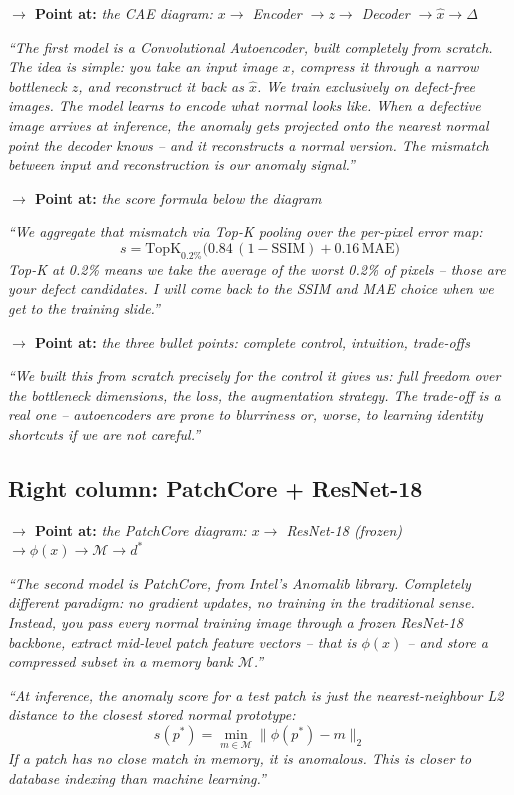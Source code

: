 \documentclass[12pt, a4paper]{article}
\newcommand{\say}[1]{%
  \begin{mdframed}[style=saybox]
  \itshape ``#1''
  \end{mdframed}
}
\newcommand{\pointer}[1]{\noindent\textbf{\color{teal}$\rightarrow$ Point at:} \textit{#1}\\[2pt]}
\begin{document}
\pointer{the CAE diagram: $x \to$ Encoder $\to z \to$ Decoder $\to \hat{x} \to \Delta$}

\say{The first model is a Convolutional Autoencoder, built completely from scratch. The idea is simple: you take an input image $x$, compress it through a narrow bottleneck $z$, and reconstruct it back as $\hat{x}$. We train exclusively on defect-free images. The model learns to encode what normal looks like. When a defective image arrives at inference, the anomaly gets projected onto the nearest normal point the decoder knows -- and it reconstructs a normal version. The mismatch between input and reconstruction is our anomaly signal.}

\pointer{the score formula below the diagram}

\say{We aggregate that mismatch via Top-K pooling over the per-pixel error map:
\[
  s = \mathrm{TopK}_{0.2\%}\!\bigl(0.84\,(1-\mathrm{SSIM}) + 0.16\,\mathrm{MAE}\bigr)
\]
Top-K at 0.2\% means we take the average of the worst 0.2\% of pixels -- those are your defect candidates. I will come back to the SSIM and MAE choice when we get to the training slide.}

\pointer{the three bullet points: complete control, intuition, trade-offs}

\say{We built this from scratch precisely for the control it gives us: full freedom over the bottleneck dimensions, the loss, the augmentation strategy. The trade-off is a real one -- autoencoders are prone to blurriness or, worse, to learning identity shortcuts if we are not careful.}

\subsection{Right column: PatchCore + ResNet-18}

\pointer{the PatchCore diagram: $x \to$ ResNet-18 (frozen) $\to \phi(x) \to \mathcal{M} \to d^*$}

\say{The second model is PatchCore, from Intel's Anomalib library. Completely different paradigm: no gradient updates, no training in the traditional sense. Instead, you pass every normal training image through a frozen ResNet-18 backbone, extract mid-level patch feature vectors -- that is $\phi(x)$ -- and store a compressed subset in a memory bank $\mathcal{M}$.}

\say{At inference, the anomaly score for a test patch is just the nearest-neighbour L2 distance to the closest stored normal prototype:
\[
  s(p^*) = \min_{m \in \mathcal{M}} \|\phi(p^*) - m\|_2
\]
If a patch has no close match in memory, it is anomalous. This is closer to database indexing than machine learning.}
\end{document}
